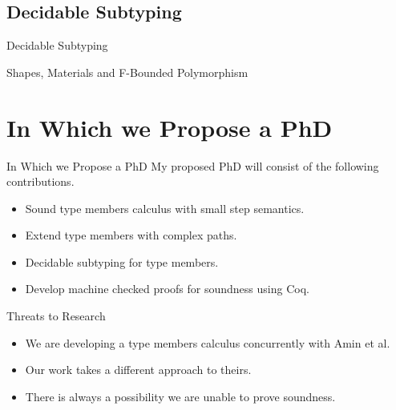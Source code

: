 \documentclass[dvipsnames]{beamer}
\begin{document}
\subsection{Decidable Subtyping}

\begin{frame}{Decidable Subtyping}
\end{frame}

\begin{frame}{Shapes, Materials and F-Bounded Polymorphism}
\end{frame}

\section{In Which we Propose a PhD}

\begin{frame}{In Which we Propose a PhD}
My proposed PhD will consist of the following contributions.
\begin{itemize}
\item
Sound type members calculus with small step semantics.
\item
Extend type members with complex paths.
\item
Decidable subtyping for type members.
\item
Develop machine checked proofs for soundness using Coq.
\end{itemize}
\end{frame}

\begin{frame}{Threats to Research}
\begin{itemize}
\item
We are developing a type members calculus concurrently with Amin et al.
\item
Our work takes a different approach to theirs.
\item
There is always a possibility we are unable to prove soundness.
\end{itemize}
\end{frame}
\end{document}
